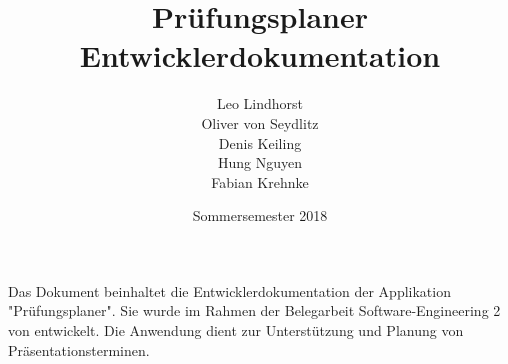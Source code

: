\documentclass{scrartcl}
\begin{document}
	\title{Prüfungsplaner \\ Entwicklerdokumentation}
	\author{Leo Lindhorst\\
		Oliver von Seydlitz\\
		Denis Keiling\\
		Hung Nguyen\\
		Fabian Krehnke}
	\date{Sommersemester 2018}
	\maketitle
	
	Das Dokument beinhaltet die Entwicklerdokumentation der Applikation "Prüfungsplaner". Sie wurde im Rahmen der Belegarbeit Software-Engineering 2 von entwickelt. Die Anwendung dient zur Unterstützung und Planung von Präsentationsterminen.
	
	\tableofcontents
	
\end{document}
